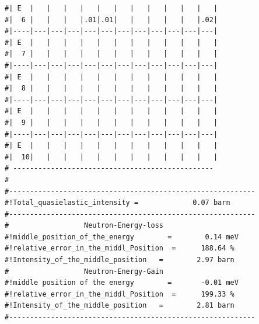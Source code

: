 \begin{enumerate}
{\begin{verbatim}
#| E  |   |   |   |   |   |   |   |   |   |   |   |
#|  6 |   |   |   |.01|.01|   |   |   |   |   |.02|
#|----|---|---|---|---|---|---|---|---|---|---|---|
#| E  |   |   |   |   |   |   |   |   |   |   |   |
#|  7 |   |   |   |   |   |   |   |   |   |   |   |
#|----|---|---|---|---|---|---|---|---|---|---|---|
#| E  |   |   |   |   |   |   |   |   |   |   |   |
#|  8 |   |   |   |   |   |   |   |   |   |   |   |
#|----|---|---|---|---|---|---|---|---|---|---|---|
#| E  |   |   |   |   |   |   |   |   |   |   |   |
#|  9 |   |   |   |   |   |   |   |   |   |   |   |
#|----|---|---|---|---|---|---|---|---|---|---|---|
#| E  |   |   |   |   |   |   |   |   |   |   |   |
#|  10|   |   |   |   |   |   |   |   |   |   |   |
# ------------------------------------------------ 
#
#-----------------------------------------------------------
#!Total_quasielastic_intensity =             0.07 barn           
#-----------------------------------------------------------
#                  Neutron-Energy-loss                      
#!middle_position_of_the_energy        =        0.14 meV    
#!relative_error_in_the_middl_Position  =      188.64 %      
#!Intensity_of_the_middle_position   =        2.97 barn   
#                  Neutron-Energy-Gain                 
#!middle position of the energy        =       -0.01 meV    
#!relative_error_in_the_middl_Position  =      199.33 %      
#!Intensity_of_the_middle_position   =        2.81 barn   
#-----------------------------------------------------------


\end{verbatim}}
\end{enumerate}
